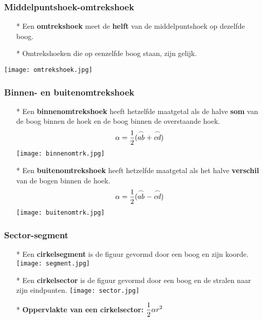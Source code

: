 \subsubsection{Middelpuntshoek-omtrekshoek} \label{middelpunts-omtrekshoek}
\hypertarget{middelpunts-omtrekshoek}{}
	\begin{itemize}
	\item[*] Een {\bf omtrekshoek} meet de {\bf helft} van de middelpuntshoek op dezelfde 	boog.
	\item[*] Omtrekshoeken die op eenzelfde boog staan, zijn gelijk.
	\end{itemize}
        \texttt{[image: omtrekshoek.jpg]}

\subsubsection{Binnen- en buitenomtrekshoek} \label{binnen-buitenomtrekshoek} 
\hypertarget{binnen-buitenomtrekshoek}{}
	\begin{itemize}
	\item[*] Een {\bf binnenomtrekshoek} heeft hetzelfde maatgetal als de halve {\bf som} van 	de boog binnen de hoek en de boog binnen de overstaande hoek.
	\[\alpha=\displaystyle\frac{\displaystyle 1}{\displaystyle 2}(\stackrel{\frown}{ab}+\stackrel{\frown}{cd})\]
        \texttt{[image: binnenomtrk.jpg]}
	\item[*] Een {\bf buitenomtrekshoek} heeft hetzelfde maatgetal als het halve {\bf 	verschil} van de bogen binnen de hoek. 
	\[\alpha=\displaystyle\frac{\displaystyle 1}{\displaystyle 2}(\stackrel{\frown}{ab}-\stackrel{\frown}{cd})\]
        \texttt{[image: buitenomtrk.jpg]}
	\end{itemize}

\subsubsection{Sector-segment} \label{sector-segment}
\hypertarget{sector-segment}{}
	\begin{itemize}
	\item[*]Een {\bf cirkelsegment} is de figuur gevormd door een boog en zijn koorde.\newline
        \texttt{[image: segment.jpg]}
	\item[*]Een \hypertarget{sector}{{\bf cirkelsector}} is de figuur gevormd door een boog en de stralen naar zijn eindpunten.\label{sector}\newline
        \texttt{[image: sector.jpg]}
	\item[*] {\bf Oppervlakte van een cirkelsector:} $\displaystyle\frac{\displaystyle 1}{\displaystyle 2}\alpha r^2$
	\end{itemize}

